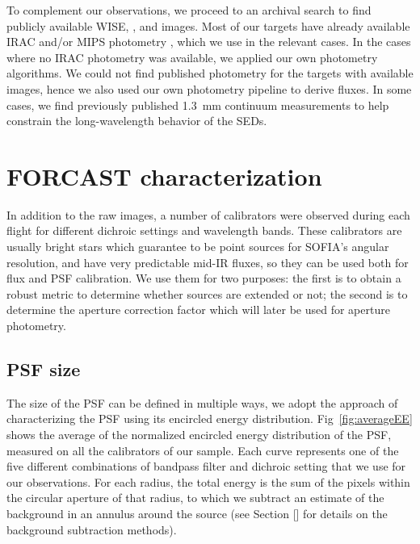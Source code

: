 To complement our observations, we proceed to an archival search to find publicly available WISE, \Spitzer, and \Herschel images. Most of our targets have already available \Spitzer IRAC and/or MIPS photometry \citep[mostly from][]{Gutermuth:2009gca,Megeath:2012cn,Evans:2009bka}, which we use in the relevant cases. In the cases where no IRAC photometry was available, we applied our own photometry algorithms. We could not find published photometry for the targets with available \Herschel images, hence we also used our own photometry pipeline to derive fluxes. In some cases, we find previously published \SI{1.3}{\milli\meter} continuum measurements to help constrain the long-wavelength behavior of the SEDs.


\section{FORCAST characterization}

In addition to the raw images, a number of calibrators were observed during each flight for different dichroic settings and wavelength bands. These calibrators are usually bright stars which guarantee to be point sources for SOFIA's angular resolution, and have very predictable mid-IR fluxes, so they can be used both for flux and PSF calibration. We use them for two purposes: the first is to obtain a robust metric to determine whether sources are extended or not; the second is to determine the aperture correction factor which will later be used for aperture photometry. 

\subsection{PSF size}
The size of the PSF can be defined in multiple ways, we adopt the approach of characterizing the PSF using its encircled energy distribution. Fig~\ref{fig:averageEE} shows the average of the normalized encircled energy distribution of the PSF, measured on all the calibrators of our sample. Each curve represents one of the five different combinations of bandpass filter and dichroic setting that we use for our observations. For each radius, the total energy is the sum of the pixels within the circular aperture of that radius, to which we subtract an estimate of the background in an annulus around the source (see Section [] for details on the background subtraction methods). 

